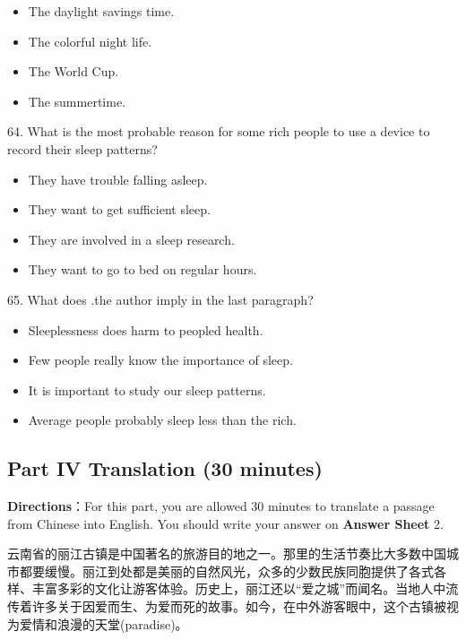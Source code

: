 \documentclass[UTF8,11pt]{ctexart}
\begin{document}
\begin{itemize}[leftmargin=2em,itemsep=.2em,topsep=.4em]\item[A.] The daylight savings time.
\item[B.] The colorful night life.
\item[C.] The World Cup.
\item[D.] The summertime.
\end{itemize}

64. What is the most probable reason for some rich people to use a device to record their sleep patterns?


\begin{itemize}[leftmargin=2em,itemsep=.2em,topsep=.4em]\item[A.] They have trouble falling asleep.
\item[B.] They want to get sufficient sleep.
\item[C.] They are involved in a sleep research.
\item[D.] They want to go to bed on regular hours.
\end{itemize}

65. What does .the author imply in the last paragraph?


\begin{itemize}[leftmargin=2em,itemsep=.2em,topsep=.4em]\item[A.] Sleeplessness does harm to peopled health.
\item[B.] Few people really know the importance of sleep.
\item[C.] It is important to study our sleep patterns.
\item[D.] Average people probably sleep less than the rich.
\end{itemize}

\subsection*{\textbf{Part IV} \textbf{Translation} \textbf{(30 minutes)}}


\textbf{Directions}：For this part, you are allowed 30 minutes to translate a passage from Chinese into English. You should write your answer on\textbf{ Answer Sheet} 2.


云南省的丽江古镇是中国著名的旅游目的地之一。那里的生活节奏比大多数中国城市都要缓慢。丽江到处都是美丽的自然风光，众多的少数民族同胞提供了各式各样、丰富多彩的文化让游客体验。历史上，丽江还以“爱之城”而闻名。当地人中流传着许多关于因爱而生、为爱而死的故事。如今，在中外游客眼中，这个古镇被视为爱情和浪漫的天堂(paradise)。
\end{document}
